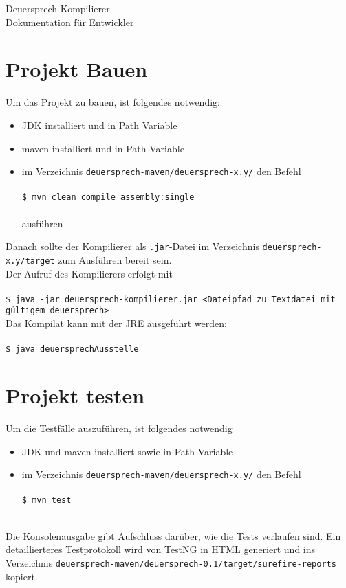 \documentclass[a4paper]{article}
\begin{document}
    \begin{center}
        \LARGE
        Deuersprech-Kompilierer \\
        Dokumentation für Entwickler \\
    \end{center}
    
    \section{Projekt Bauen}
    Um das Projekt zu bauen, ist folgendes notwendig:
    \begin{itemize}
        \item JDK installiert und in Path Variable
        \item maven installiert und in Path Variable
        \item im Verzeichnis \texttt{deuersprech-maven/deuersprech-x.y/} den Befehl\\
        \\
         \texttt{\$ mvn clean compile assembly:single} \\
        \\
         ausführen
    \end{itemize}
    Danach sollte der Kompilierer als \texttt{.jar}-Datei im Verzeichnis \texttt{deuersprech-x.y/target} zum Ausführen bereit sein. \\
    Der Aufruf des Kompilierers erfolgt mit \\
    \\
    \texttt{\$ java -jar deuersprech-kompilierer.jar <Dateipfad zu Textdatei mit gültigem deuersprech>} \\

    \noindent
    Das Kompilat kann mit der JRE ausgeführt werden:\\
    \\
    \texttt{\$ java deuersprechAusstelle}

    \section{Projekt testen}
    Um die Testfälle auszuführen, ist folgendes notwendig
    \begin{itemize}
        \item JDK und maven installiert sowie in Path Variable 
        \item im Verzeichnis \texttt{deuersprech-maven/deuersprech-x.y/} den Befehl\\
        \\
         \texttt{\$ mvn test} \\
        \\   
    \end{itemize}
    Die Konsolenausgabe gibt Aufschluss darüber, wie die Tests verlaufen sind. 
    Ein detaillierteres Testprotokoll wird von TestNG in HTML generiert und ins Verzeichnis \texttt{deuersprech-maven/deuersprech-0.1/target/surefire-reports} kopiert.
\end{document}
